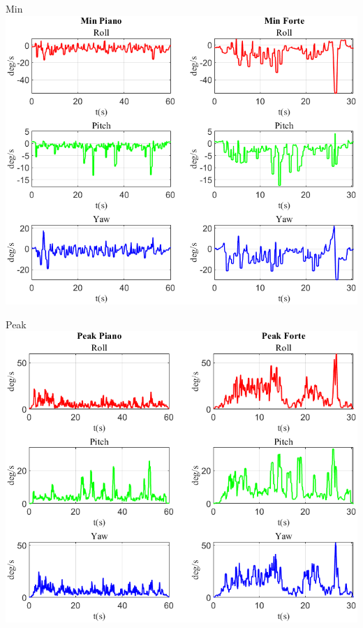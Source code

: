 	\begin{frame}{{Min}}
		\centering\includegraphics[height=.8\textheight]{figure/VAng/Min}
	\end{frame}
	
	\begin{frame}{{Peak}}
		\centering\includegraphics[height=.8\textheight]{figure/VAng/Peak}
	\end{frame}
	

